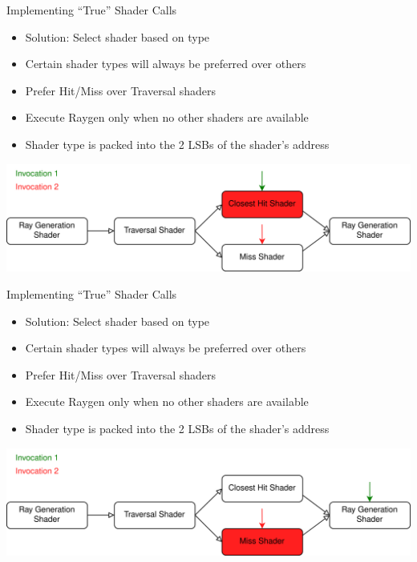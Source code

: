 \documentclass[aspectratio=169,t]{beamer}
\begin{document}
\begin{slide}{Implementing ``True'' Shader Calls}
 \begin{itemize}
  \item Solution: Select shader based on type
  \item Certain shader types will always be preferred over others
  \item Prefer Hit/Miss over Traversal shaders
  \item Execute Raygen only when no other shaders are available
  \item Shader type is packed into the 2 LSBs of the shader's address
 \end{itemize}
 \includegraphics[width=\textwidth]{graphics/RTStages2-3.png}
\end{slide}

\begin{slide}{Implementing ``True'' Shader Calls}
 \begin{itemize}
  \item Solution: Select shader based on type
  \item Certain shader types will always be preferred over others
  \item Prefer Hit/Miss over Traversal shaders
  \item Execute Raygen only when no other shaders are available
  \item Shader type is packed into the 2 LSBs of the shader's address
 \end{itemize}
 \includegraphics[width=\textwidth]{graphics/RTStages2-7.png}
\end{slide}
\end{document}
